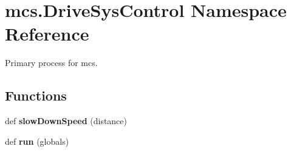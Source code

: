 \hypertarget{namespacemcs_1_1DriveSysControl}{}\section{mcs.\+Drive\+Sys\+Control Namespace Reference}
\label{namespacemcs_1_1DriveSysControl}


Primary process for mcs.  


\subsection*{Functions}
\begin{DoxyCompactItemize}
\item 
\mbox{\label{namespacemcs_1_1DriveSysControl_a5568a949b8d75113477ea00b30696e04}} 
def {\bfseries slow\+Down\+Speed} (distance)
\item 
\mbox{\label{namespacemcs_1_1DriveSysControl_a2ea248d98ba00bfca48e6303f86b07ae}} 
def {\bfseries run} (globals)
\end{DoxyCompactItemize}
